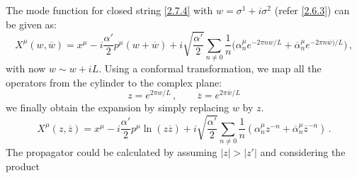 \begin{tcolorbox}[breakable]
	The mode function for closed string \eqref{2.7.4} with $w=\sigma^1+i\sigma^2$ (refer \eqref{2.6.3}) can be given as:
	\begin{equation}\label{mode-expansion-boson} 
		X^{\mu}(w,\overline{w}) = x^{\mu}-i\frac{\alpha'}{2} p^{\mu} (w+\overline{w})+i\sqrt{\frac{\alpha'}{2}}\sum_{n\neq 0} \frac{1}{n} \bigg( \alpha^{\mu}_n e^{-2\pi n w /L} + \overline{\alpha}^{\mu}_n e^{-2\pi n\overline{w})/L}
		\bigg)\, ,
	\end{equation}
	with now $w\sim w+iL$. Using a conformal transformation, we map all the operators from the cylinder  to the complex plane:
	$$z=e^{2\pi w /L}\, , \qquad   \overline{z}=e^{2\pi \overline{w}/L}$$
	we finally obtain the expansion by simply replacing $w$ by $z$.
	\begin{equation}   X^{\mu}(z, \overline{z})  =x^{\mu}-i\frac{\alpha'}{2} p^{\mu} \ln(z\overline{z})  +i\sqrt{\frac{\alpha'}{2}}\sum_{n\neq 0} \frac{1}{n}   (\alpha^{\mu}_n z^{-n}+\overline{\alpha}^{\mu}_n \overline{z}^{-n}  )\, . \end{equation}
	The propagator could be calculated by assuming $|z|>|z'|$ and considering the product
	

\end{tcolorbox}
